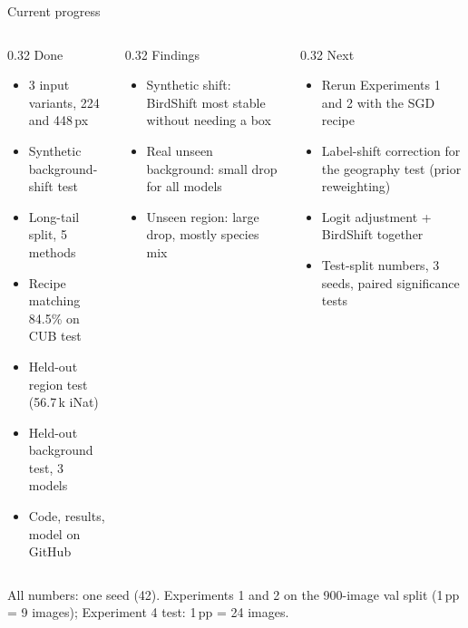 \documentclass[aspectratio=169,10pt]{beamer}
\newcommand{\serif}{\fontfamily{ppl}\selectfont}
\newcommand{\aside}[1]{{\footnotesize\color{muted}#1}}
\begin{document}
\begin{frame}{Current progress}
\begin{columns}[t]
\begin{column}{0.32\textwidth}
{\serif\Large Done}\par\vspace{0.15cm}
\begin{itemize}\small
  \item 3 input variants, 224 and 448\,px
  \item Synthetic background-shift test
  \item Long-tail split, 5 methods
  \item Recipe matching 84.5\% on CUB test
  \item Held-out region test (56.7\,k iNat)
  \item Held-out background test, 3 models
  \item Code, results, model on GitHub
\end{itemize}
\end{column}
\begin{column}{0.32\textwidth}
{\serif\Large Findings}\par\vspace{0.15cm}
\begin{itemize}\small
  \item Synthetic shift: BirdShift most stable without needing a box
  \item Real unseen background: small drop for all models
  \item Unseen region: large drop, mostly species mix
\end{itemize}
\end{column}
\begin{column}{0.32\textwidth}
{\serif\Large Next}\par\vspace{0.15cm}
\begin{itemize}\small
  \item Rerun Experiments 1 and 2 with the SGD recipe
  \item Label-shift correction for the geography test (prior reweighting)
  \item Logit adjustment + BirdShift together
  \item Test-split numbers, 3 seeds, paired significance tests
\end{itemize}
\end{column}
\end{columns}
\vspace{0.5cm}
\aside{All numbers: one seed (42). Experiments 1 and 2 on the 900-image val split (1\,pp = 9 images); Experiment 4 test: 1\,pp = 24 images.}
\end{frame}
\end{document}
